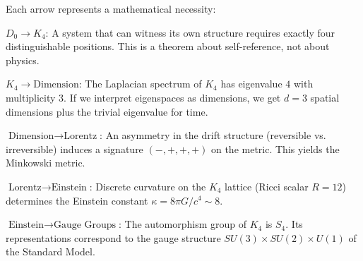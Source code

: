 \documentclass[11pt,a4paper]{book}
\begin{document}
\begin{center}
\end{center}

Each arrow represents a mathematical necessity:

\textbf{$D_0 \to K_4$}: A system that can witness its own structure requires exactly four distinguishable positions. This is a theorem about self-reference, not about physics.

\textbf{$K_4 \to \text{Dimension}$}: The Laplacian spectrum of $K_4$ has eigenvalue $4$ with multiplicity $3$. If we interpret eigenspaces as dimensions, we get $d=3$ spatial dimensions plus the trivial eigenvalue for time.

\textbf{$\text{Dimension} \to \text{Lorentz}$}: An asymmetry in the drift structure (reversible vs. irreversible) induces a signature $(-,+,+,+)$ on the metric. This yields the Minkowski metric.

\textbf{$\text{Lorentz} \to \text{Einstein}$}: Discrete curvature on the $K_4$ lattice (Ricci scalar $R=12$) determines the Einstein constant $\kappa = 8\pi G / c^4 \sim 8$.

\textbf{$\text{Einstein} \to \text{Gauge Groups}$}: The automorphism group of $K_4$ is $S_4$. Its representations correspond to the gauge structure $SU(3) \times SU(2) \times U(1)$ of the Standard Model.
\end{document}
